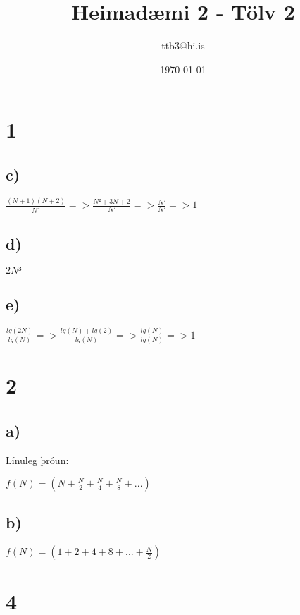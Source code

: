 \documentclass{article}
\title{Heimadæmi 2 - Tölv 2}
\author{ttb3@hi.is}
\date{\today}
\begin{document}
\maketitle

\section*{1}
\subsection*{c)}
$\frac{(N+1)(N+2)}{N^2} => \frac{N²+3N+2}{N²} => \frac{N²}{N²} => 1$

\subsection*{d)}
$2N³$

\subsection*{e)}
$\frac{lg(2N)}{lg(N)} => \frac{lg(N)+lg(2)}{lg(N)} => \frac{lg(N)}{lg(N)} => 1$

\section*{2}
\subsection*{a)}
Línuleg þróun:

$f(N) = (N+\frac{N}{2}+\frac{N}{4}+\frac{N}{8}+...)$

\subsection*{b)}

$f(N) = (1+2+4+8+...+\frac{N}{2})$

\section*{4}
\end{document}
